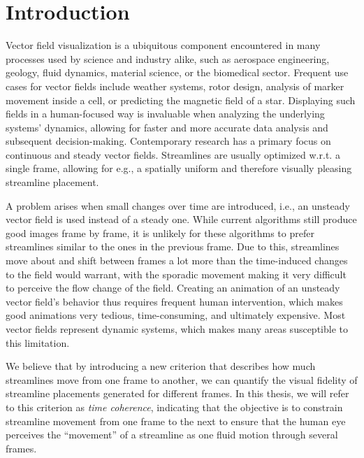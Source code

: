 
\chapter{Introduction}
Vector field visualization is a ubiquitous component encountered in many processes used by science and industry alike,
such as aerospace engineering, geology, fluid dynamics, material science, or the biomedical sector.
Frequent use cases for vector fields include weather systems, rotor design,
analysis of marker movement inside a cell, or predicting the magnetic field of a star.
Displaying such fields in a human-focused way is invaluable when analyzing the
underlying systems' dynamics, allowing for faster and more accurate data analysis
and subsequent decision-making.
Contemporary research has a primary focus on continuous and steady vector fields.
Streamlines are usually optimized w.r.t. a single frame, allowing for e.g.,
a spatially uniform and therefore visually pleasing streamline placement.

A problem arises when small changes over time are introduced, i.e.,
an unsteady vector field is used instead of a steady one.
While current algorithms still produce good images frame by frame,
it is unlikely for these algorithms to prefer streamlines similar to the ones in the previous frame.
Due to this, streamlines move about and shift between frames a lot more than the time-induced changes to the field would warrant,
with the sporadic movement making it very difficult to perceive the flow change of the field.
Creating an animation of an unsteady vector field's behavior thus requires frequent human intervention,
which makes good animations very tedious, time-consuming, and ultimately expensive.
Most vector fields represent dynamic systems, which makes many areas susceptible to this limitation.

We believe that by introducing a new criterion that describes how much streamlines move from one frame to another,
we can quantify the visual fidelity of streamline placements generated for different frames.
In this thesis, we will refer to this criterion as \textit{time coherence}, indicating that
the objective is to constrain streamline movement from one frame to the next to ensure
that the human eye perceives the ``movement'' of a streamline as one fluid motion
through several frames.
\newpage

